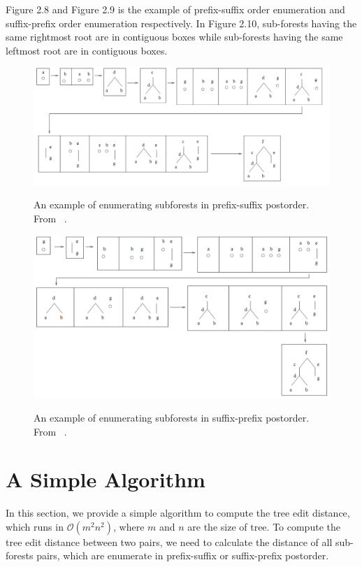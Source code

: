 Figure 2.8 and Figure 2.9 is the example of prefix-suffix order enumeration and suffix-prefix order enumeration respectively. In Figure 2.10, sub-forests having the same rightmost root are in contiguous boxes while sub-forests having the same leftmost root are in contiguous boxes.

\begin{figure}
		\centering
		\includegraphics[width=12cm,clip]{Figures/PrefixSuffixPostorder}
		\label{Prefix-suffix Postorder Enumeration} 
		\caption{An example of enumerating subforests in prefix-suffix postorder. From ~\cite{Chen2014}.}
\end{figure}

\begin{figure}
		\centering
		\includegraphics[width=12cm,clip]{Figures/SuffixPrefixPostorder}
		\label{Suffix-prefix Postorder Enumeration} 
		\caption{An example of enumerating subforests in suffix-prefix postorder. From ~\cite{Chen2014}.}
\end{figure}

\section{A Simple Algorithm}
In this section, we provide a simple algorithm to compute the tree edit distance, which runs in $\mathcal{O}(m^{2}n^{2})$, where $m$ and $n$ are the size of tree. To compute the tree edit distance between two pairs, we need to calculate the distance of all sub-forests pairs, which are enumerate in prefix-suffix or suffix-prefix postorder. 

